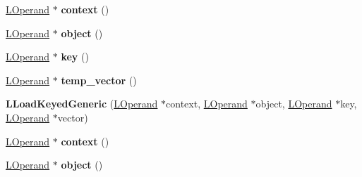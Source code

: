 \begin{DoxyCompactItemize}
\item 
\hyperlink{classv8_1_1internal_1_1_l_operand}{L\+Operand} $\ast$ {\bfseries context} ()\hypertarget{classv8_1_1internal_1_1_l_load_keyed_generic_a522e2bd4a7d1b71a95f891c1fc9a99c8}{}\label{classv8_1_1internal_1_1_l_load_keyed_generic_a522e2bd4a7d1b71a95f891c1fc9a99c8}

\item 
\hyperlink{classv8_1_1internal_1_1_l_operand}{L\+Operand} $\ast$ {\bfseries object} ()\hypertarget{classv8_1_1internal_1_1_l_load_keyed_generic_aadfba9d6286d59cc727bce5ae1b74ee7}{}\label{classv8_1_1internal_1_1_l_load_keyed_generic_aadfba9d6286d59cc727bce5ae1b74ee7}

\item 
\hyperlink{classv8_1_1internal_1_1_l_operand}{L\+Operand} $\ast$ {\bfseries key} ()\hypertarget{classv8_1_1internal_1_1_l_load_keyed_generic_ad55d2217ba38aa46911c0e797a610388}{}\label{classv8_1_1internal_1_1_l_load_keyed_generic_ad55d2217ba38aa46911c0e797a610388}

\item 
\hyperlink{classv8_1_1internal_1_1_l_operand}{L\+Operand} $\ast$ {\bfseries temp\+\_\+vector} ()\hypertarget{classv8_1_1internal_1_1_l_load_keyed_generic_ac529ed41ee727bf1e320ad6711ce2cff}{}\label{classv8_1_1internal_1_1_l_load_keyed_generic_ac529ed41ee727bf1e320ad6711ce2cff}

\item 
{\bfseries L\+Load\+Keyed\+Generic} (\hyperlink{classv8_1_1internal_1_1_l_operand}{L\+Operand} $\ast$context, \hyperlink{classv8_1_1internal_1_1_l_operand}{L\+Operand} $\ast$object, \hyperlink{classv8_1_1internal_1_1_l_operand}{L\+Operand} $\ast$key, \hyperlink{classv8_1_1internal_1_1_l_operand}{L\+Operand} $\ast$vector)\hypertarget{classv8_1_1internal_1_1_l_load_keyed_generic_a00c3e8047fc556277f4ec4ebc4207cf8}{}\label{classv8_1_1internal_1_1_l_load_keyed_generic_a00c3e8047fc556277f4ec4ebc4207cf8}

\item 
\hyperlink{classv8_1_1internal_1_1_l_operand}{L\+Operand} $\ast$ {\bfseries context} ()\hypertarget{classv8_1_1internal_1_1_l_load_keyed_generic_a522e2bd4a7d1b71a95f891c1fc9a99c8}{}\label{classv8_1_1internal_1_1_l_load_keyed_generic_a522e2bd4a7d1b71a95f891c1fc9a99c8}

\item 
\hyperlink{classv8_1_1internal_1_1_l_operand}{L\+Operand} $\ast$ {\bfseries object} ()\hypertarget{classv8_1_1internal_1_1_l_load_keyed_generic_aadfba9d6286d59cc727bce5ae1b74ee7}{}\label{classv8_1_1internal_1_1_l_load_keyed_generic_aadfba9d6286d59cc727bce5ae1b74ee7}


\end{DoxyCompactItemize}

